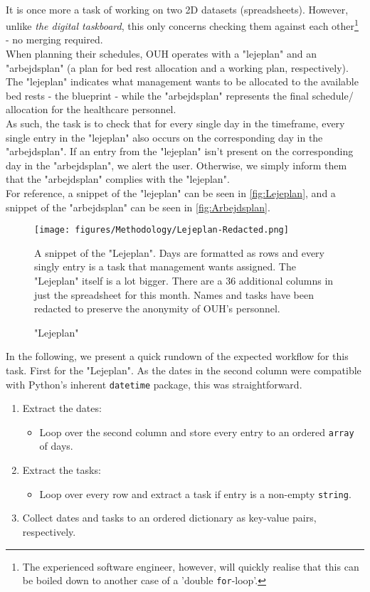 \\
It is once more a task of working on two 2D datasets (spreadsheets). However, unlike \emph{the digital taskboard}, this only concerns checking them against each other\footnote{The experienced software engineer, however, will quickly realise that this can be boiled down to another case of a 'double \texttt{for}-loop'.} - no merging required.
\\
When planning their schedules, OUH operates with a "lejeplan" and an "arbejdsplan" (a plan for bed rest allocation and a working plan, respectively). The "lejeplan" indicates what management wants to be allocated to the available bed rests - the blueprint - while the "arbejdsplan" represents the final schedule/ allocation for the healthcare personnel. 
\\
As such, the task is to check that for every single day in the timeframe, every single entry in the "lejeplan" also occurs on the corresponding day in the "arbejdsplan". If an entry from the "lejeplan" isn't present on the corresponding day in the "arbejdsplan", we alert the user. Otherwise, we simply inform them that the "arbejdsplan" complies with the "lejeplan".
\\
For reference, a snippet of the "lejeplan" can be seen in \autoref{fig:Lejeplan}, and a snippet of the "arbejdsplan" can be seen in \autoref{fig:Arbejdsplan}.
\begin{figure}[H]
    \centering
    \texttt{[image: figures/Methodology/Lejeplan-Redacted.png]}
    \caption{"Lejeplan"}
    \small
    \raggedright 
    A snippet of the "Lejeplan". Days are formatted as rows and every singly entry is a task that management wants assigned. The "Lejeplan" itself is a lot bigger. There are a \(36\) additional columns in just the spreadsheet for this month. Names and tasks have been redacted to preserve the anonymity of OUH's personnel.
    \label{fig:Lejeplan}
\end{figure}

In the following, we present a quick rundown of the expected workflow for this task. First for the "Lejeplan". As the dates in the second column were compatible with Python's inherent \texttt{datetime} package, this was straightforward.
\begin{enumerate}
	\item Extract the dates:
		\begin{itemize}
			\item Loop over the second column and store every entry to an ordered \texttt{array} of days.	
		\end{itemize}
	\item Extract the tasks:
		\begin{itemize}
			\item Loop over every row and extract a task if entry is a non-empty \texttt{string}.	
		\end{itemize}
	\item Collect dates and tasks to an ordered \gls{dictionary} as key-value pairs, respectively.
\end{enumerate}

